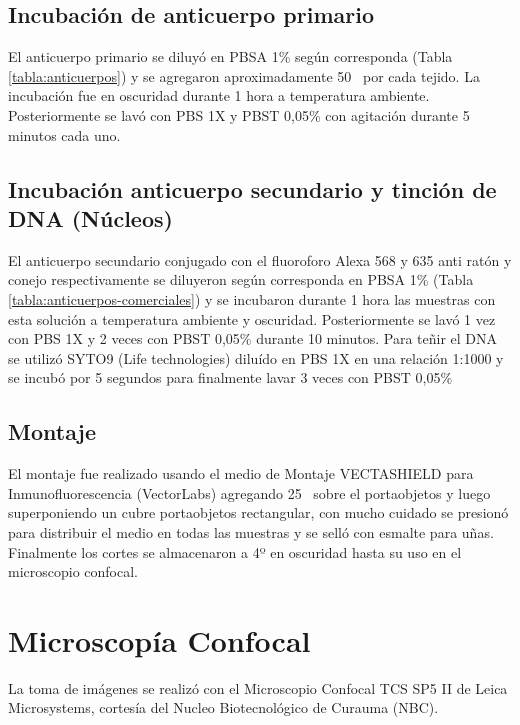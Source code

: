 \documentclass[12pt,a4paper,oneside]{scrbook}
\begin{document}
\subsection{Incubación de anticuerpo
primario}\label{incubaciuxf3n-de-anticuerpo-primario}

El anticuerpo primario se diluyó en PBSA 1\% según corresponda (Tabla
\ref{tabla:anticuerpos}) y se agregaron aproximadamente
50\si{\micro\litro} por cada tejido. La incubación fue en oscuridad
durante 1 hora a temperatura ambiente. Posteriormente se lavó con PBS 1X
y PBST 0,05\% con agitación durante 5 minutos cada uno.

\subsection{Incubación anticuerpo secundario y tinción de DNA
(Núcleos)}\label{incubaciuxf3n-anticuerpo-secundario-y-tinciuxf3n-de-dna-nuxfacleos}

El anticuerpo secundario conjugado con el fluoroforo Alexa 568 y 635
anti ratón y conejo respectivamente se diluyeron según corresponda en
PBSA 1\% (Tabla \ref{tabla:anticuerpos-comerciales}) y se incubaron
durante 1 hora las muestras con esta solución a temperatura ambiente y
oscuridad. Posteriormente se lavó 1 vez con PBS 1X y 2 veces con PBST
0,05\% durante 10 minutos. Para teñir el DNA se utilizó SYTO9 (Life
technologies) diluído en PBS 1X en una relación 1:1000 y se incubó por 5
segundos para finalmente lavar 3 veces con PBST 0,05\%

\subsection{Montaje}\label{montaje}

El montaje fue realizado usando el medio de Montaje VECTASHIELD para
Inmunofluorescencia (VectorLabs) agregando 25\si{\micro\litro} sobre el
portaobjetos y luego superponiendo un cubre portaobjetos rectangular,
con mucho cuidado se presionó para distribuir el medio en todas las
muestras y se selló con esmalte para uñas. Finalmente los cortes se
almacenaron a 4º en oscuridad hasta su uso en el microscopio confocal.

\section{Microscopía Confocal}\label{microscopuxeda-confocal}

La toma de imágenes se realizó con el Microscopio Confocal TCS SP5 II de
Leica Microsystems, cortesía del Nucleo Biotecnológico de Curauma (NBC).
\end{document}
